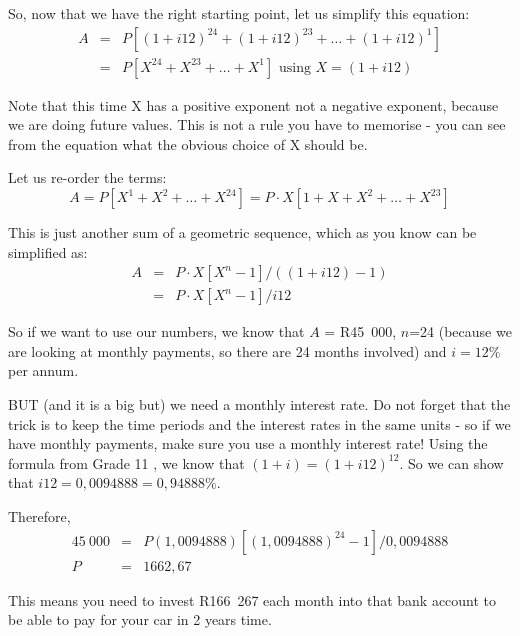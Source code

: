 So, now that we have the right starting point, let us simplify this equation:
\begin{eqnarray*}
A &=& P[(1+i12)^{24} + (1+i12)^{23} + \ldots + (1+i12)^{1}]\\
&=& P [ X^{24} + X^{23} + \ldots + X^1] \mbox{ using $X=(1+i12)$}
\end{eqnarray*}

Note that this time X has a positive exponent not a negative exponent, because we are doing future values. This is not a rule you have to memorise - you can see from the equation what the obvious choice of X should be.

Let us re-order the terms:
\begin{equation*}
A = P [ X^1 + X^2 + \ldots + X^{24}] = P \cdot X [1 + X + X^2 + \ldots + X^{23}]
\end{equation*}

This is just another sum of a geometric sequence, which as you know can be simplified as:
\begin{eqnarray*}
A &=& P \cdot X [X^n - 1] / ((1+i12)-1)\\
&=& P \cdot X [X^n - 1] / i12
\end{eqnarray*}

So if we want to use our numbers, we know that $A$ = R45~000, $n$=24 (because we are looking at monthly payments, so there are 24 months involved) and $i = 12\%$ per annum.

BUT (and it is a big but) we need a monthly interest rate. Do not forget that the trick is to keep the time periods and the interest rates in the same units - so if we have monthly payments, make sure you use a monthly interest rate! Using the formula from Grade 11%
, we know that $(1+i) = (1+i12)^{12}$. So we can show that $i12 = 0,0094888 = 0,94888 \%$. 

Therefore,
\begin{eqnarray*}
45~000 &=& P (1,0094888) [(1,0094888)^{24} - 1] / 0,0094888\\
P&=&1 662,67
\end{eqnarray*}

This means you need to invest R166~267 each month into that bank account to be able to pay for your car in 2 years time.


